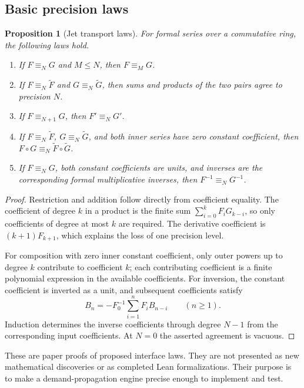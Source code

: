 \documentclass[11pt,a4paper]{article}
\newtheorem{proposition}{Proposition}[section]
\theoremstyle{definition}
\begin{document}
\subsection{Basic precision laws}
\begin{proposition}[Jet transport laws]\label{prop:jetlaws}
For formal series over a commutative ring, the following laws hold.
\begin{enumerate}
\item If \(F\equiv_N G\) and \(M\le N\), then \(F\equiv_M G\).
\item If \(F\equiv_N \widetilde F\) and \(G\equiv_N\widetilde G\), then sums and products of the two pairs agree to precision \(N\).
\item If \(F\equiv_{N+1}G\), then \(F'\equiv_N G'\).
\item If \(F\equiv_N\widetilde F\), \(G\equiv_N\widetilde G\), and both inner series have zero constant coefficient, then
\(F\circ G\equiv_N\widetilde F\circ\widetilde G\).
\item If \(F\equiv_N G\), both constant coefficients are units, and inverses are the corresponding formal multiplicative inverses, then \(F^{-1}\equiv_N G^{-1}\).
\end{enumerate}
\end{proposition}
\begin{proof}
Restriction and addition follow directly from coefficient equality. The coefficient of degree \(k\) in a product is the finite sum \(\sum_{i=0}^k F_iG_{k-i}\), so only coefficients of degree at most \(k\) are required. The derivative coefficient is \((k+1)F_{k+1}\), which explains the loss of one precision level.

For composition with zero inner constant coefficient, only outer powers up to degree \(k\) contribute to coefficient \(k\); each contributing coefficient is a finite polynomial expression in the available coefficients. For inversion, the constant coefficient is inverted as a unit, and subsequent coefficients satisfy
\[
 B_n=-F_0^{-1}\sum_{i=1}^n F_i B_{n-i}\qquad(n\ge1).
\]
Induction determines the inverse coefficients through degree \(N-1\) from the corresponding input coefficients. At \(N=0\) the asserted agreement is vacuous.
\end{proof}

These are paper proofs of proposed interface laws. They are not presented as new mathematical discoveries or as completed Lean formalizations. Their purpose is to make a demand-propagation engine precise enough to implement and test.
\end{document}
